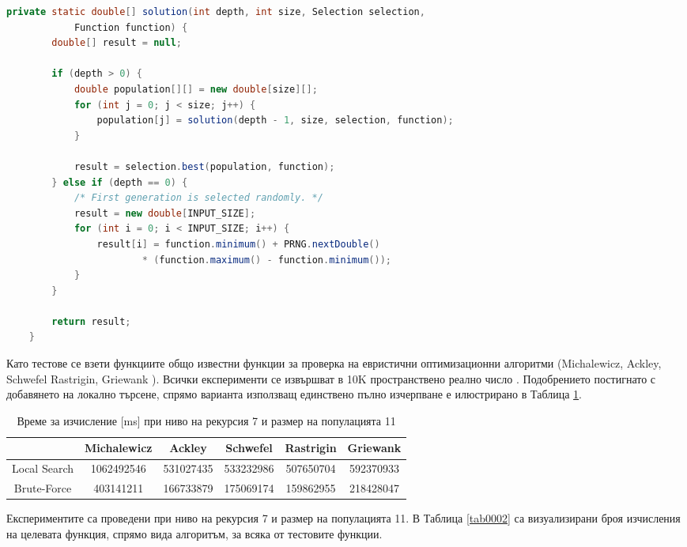 \begin{lstlisting}[caption=Йерархична селекция, language=Java, basicstyle=\tiny, label=listing013]
	private static double[] solution(int depth, int size, Selection selection,
			Function function) {
		double[] result = null;

		if (depth > 0) {
			double population[][] = new double[size][];
			for (int j = 0; j < size; j++) {
				population[j] = solution(depth - 1, size, selection, function);
			}

			result = selection.best(population, function);
		} else if (depth == 0) {
			/* First generation is selected randomly. */
			result = new double[INPUT_SIZE];
			for (int i = 0; i < INPUT_SIZE; i++) {
				result[i] = function.minimum() + PRNG.nextDouble()
						* (function.maximum() - function.minimum());
			}
		}

		return result;
	}
\end{lstlisting}

Като тестове се взети функциите общо известни функции за проверка на евристични оптимизационни алгоритми (Michalewicz, Ackley, Schwefel Rastrigin, Griewank \cite{Balabanov-01}). Всички експерименти се извършват в 10K пространствено реално число \cite{Tomov-01}. Подобрението постигнато с добавянето на локално търсене, спрямо варианта използващ единствено пълно изчерпване е илюстрирано в Таблица \ref{tab0001}.

\begin{table}[h!]
\begin{tabular}{ | c | c | c | c | c | c | }
\hline
& \cellcolor{gray!15}Michalewicz & \cellcolor{gray!15}Ackley & \cellcolor{gray!15}Schwefel & \cellcolor{gray!15}Rastrigin & \cellcolor{gray!15}Griewank \\ [0.05ex] 
\hline
\hline
Local Search & 1062492546 & 531027435 & 533232986 & 507650704 & 592370933 \\  
\hline
Brute-Force & 403141211 & 166733879 & 175069174 & 159862955 & 218428047 \\  
\hline
\end{tabular}
\caption{Време за изчисление [ms] при ниво на рекурсия 7 и размер на популацията 11}
\label{tab0001}
\end{table}

Експериментите са проведени при ниво на рекурсия 7 и размер на популацията 11. В Таблица \ref{tab0002} са визуализирани броя изчисления на целевата функция, спрямо вида алгоритъм, за всяка от тестовите функции. 

